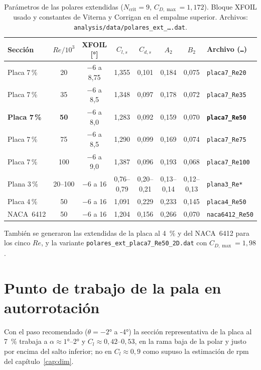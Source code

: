 \begin{table}[H]
\centering\small
\caption[Parámetros de las polares extendidas]{Parámetros de las polares extendidas ($N_{\text{crit}}=9$, $C_{D,\max}=1{,}172$).
Bloque XFOIL usado y constantes de Viterna y Corrigan en el empalme superior. Archivos:
\texttt{analysis/data/polares\_ext\_\ldots.dat}.}
\label{tab:polares-ext}
\begin{tabular}{@{}lccccccl@{}}
\toprule
\textbf{Sección} & $Re/10^3$ & \textbf{XFOIL} [\si{\degree}] & $C_{l,s}$ & $C_{d,s}$ & $A_2$ & $B_2$ & \textbf{Archivo} (\texttt{\ldots})\\\midrule
Placa 7\,\% & 20  & $-6$ a 8,75 & 1,355 & 0,101 & 0,184 & 0,075 & \texttt{placa7\_Re20}\\
Placa 7\,\% & 35  & $-6$ a 8,5  & 1,348 & 0,097 & 0,178 & 0,072 & \texttt{placa7\_Re35}\\
\textbf{Placa 7\,\%} & \textbf{50} & $-6$ a 8,0 & 1,283 & 0,092 & 0,159 & 0,070 & \texttt{\textbf{placa7\_Re50}}\\
Placa 7\,\% & 75  & $-6$ a 8,5  & 1,290 & 0,099 & 0,169 & 0,074 & \texttt{placa7\_Re75}\\
Placa 7\,\% & 100 & $-6$ a 9,0  & 1,387 & 0,096 & 0,193 & 0,068 & \texttt{placa7\_Re100}\\
Plana 3\,\% & 20--100 & $-6$ a 16 & 0,76--0,79 & 0,20--0,21 & 0,13--0,14 & 0,12--0,13 & \texttt{plana3\_Re*}\\
Placa 4\,\% & 50  & $-6$ a 16   & 1,091 & 0,229 & 0,233 & 0,145 & \texttt{placa4\_Re50}\\
NACA~6412   & 50  & $-6$ a 16   & 1,204 & 0,156 & 0,266 & 0,070 & \texttt{naca6412\_Re50}\\
\bottomrule
\end{tabular}
\end{table}
También se generaron las extendidas de la placa al \SI{4}{\percent} y del NACA~6412 para
los cinco $Re$, y la variante \texttt{polares\_ext\_placa7\_Re50\_2D.dat} con
$C_{D,\max}=1{,}98$.

\section{Punto de trabajo de la pala en autorrotación}\label{sec:polares-trabajo}

Con el paso recomendado ($\theta=\ang{-2}$ a \ang{-4}) la sección representativa de la
placa al \SI{7}{\percent} trabaja a $\alpha\approx\ang{1}$--\ang{2} y
$C_l\approx0{,}42$--$0{,}53$, en la rama baja de la polar y justo por encima del salto
inferior; no en $C_l\approx0{,}9$ como supuso la estimación de rpm del
capítulo~\ref{cap:dim}.

